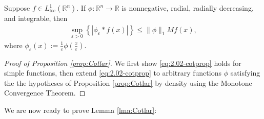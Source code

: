\documentclass[../dissertation.tex]{subfiles}
\begin{document}
\begin{prop}\label{prop:Cotlar}
    Suppose $f \in L^1_{\text{loc}}(\mathbb R^n)$. If $\phi : \mathbb R^n \to \mathbb R$ is nonnegative, 
    radial, radially decreasing, and integrable, then
    \begin{align}\label{eq:2.02-cotprop}
    	\sup_{\varepsilon > 0} \left\{ \left| \phi_\varepsilon * f(x) \right| \right\} 
            \leq \| \phi \|_1 M f(x), 
    \end{align}
    where $\phi_\varepsilon(x) := \frac{1}{\varepsilon} \phi\left( \frac{x}{\varepsilon} \right)$.
\end{prop}
\begin{proof}[Proof of Proposition \ref{prop:Cotlar}]
	We first show \eqref{eq:2.02-cotprop} holds for simple functions, then extend 
	\eqref{eq:2.02-cotprop} to arbitrary functions $\phi$ satisfying the the hypotheses 
	of Proposition \ref{prop:Cotlar} by density using the Monotone Convergence Theorem.
\end{proof}

We are now ready to prove Lemma \ref{lma:Cotlar}:
\end{document}

